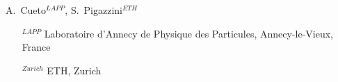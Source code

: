 \begin{flushleft}
  A.~Cueto$^{LAPP}$,
  S.~Pigazzini$^{ETH}$
\end{flushleft}

\begin{itemize}
\item[$^{LAPP}$] Laboratoire d'Annecy de Physique des Particules, Annecy-le-Vieux, France
\item[$^{Zurich}$] ETH, Zurich
\end{itemize}



